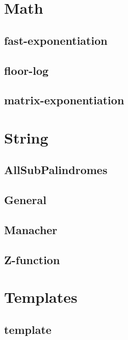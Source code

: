\documentclass{article}
\newcommand\includes[2]{ 
   \subsection{#1}
   
}
\begin{document}
\begin{multicols}{2}
\section{Math}
\includes{fast-exponentiation}{codes/Math/fast-exponentiation.cpp}
\includes{floor-log}{codes/Math/floor-log.cpp}
\includes{matrix-exponentiation}{codes/Math/matrix-exponentiation.cpp}
\section{String}
\includes{AllSubPalindromes}{codes/String/AllSubPalindromes.cpp}
\includes{General}{codes/String/General.cpp}
\includes{Manacher}{codes/String/Manacher.cpp}
\includes{Z-function}{codes/String/Z-function.cpp}
\section{Templates}
\includes{template}{codes/Templates/template.cpp}

\end{multicols}
\end{document}
